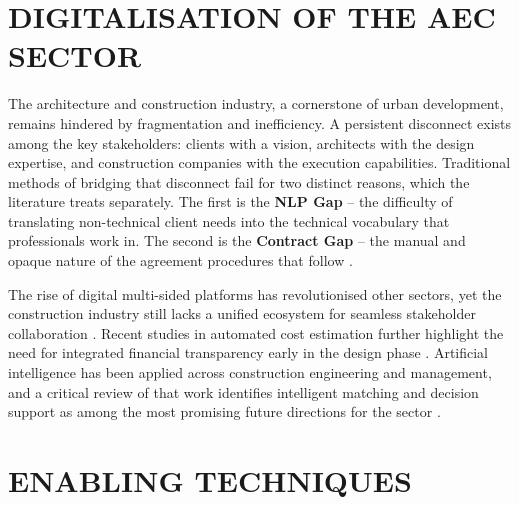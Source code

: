 \section{DIGITALISATION OF THE AEC SECTOR}
\label{sec:lit-aec-digitalisation}

The architecture and construction industry, a cornerstone of urban
development, remains hindered by fragmentation and inefficiency. A
persistent disconnect exists among the key stakeholders: clients with a
vision, architects with the design expertise, and construction companies
with the execution capabilities. Traditional methods of bridging that
disconnect fail for two distinct reasons, which the literature treats
separately. The first is the \textbf{NLP Gap} -- the difficulty of
translating non-technical client needs into the technical vocabulary
that professionals work in. The second is the \textbf{Contract Gap} --
the manual and opaque nature of the agreement procedures that follow
\cite{li2019blockchain}.

The rise of digital multi-sided platforms has revolutionised other
sectors, yet the construction industry still lacks a unified ecosystem
for seamless stakeholder collaboration \cite{hossain2018platform}.
Recent studies in automated cost estimation further highlight the need
for integrated financial transparency early in the design phase
\cite{wu2022nlp}. Artificial intelligence has been applied across
construction engineering and management, and a critical review of that
work identifies intelligent matching and decision support as among the
most promising future directions for the sector
\cite{pan2021roles}.


\section{ENABLING TECHNIQUES}
\label{sec:lit-techniques}

